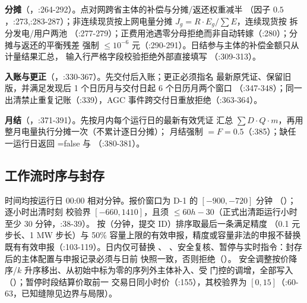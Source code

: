 \textbf{分摊}（，:264-292）。点对网跨省主体的补偿与分摊/返还权重减半
（因子 $0.5$，:273,:283-287）；非连续现货按上网电量分摊
$J_g=R\cdot E_g/\sum E$，连续现货按  拆分发电/用户两池
（:277-279）；正费用池遇零分母拒绝而非自动转嫁（:280）；分摊与返还的平衡残差
强制 $\le10^{-6}$ 元（:290-291）。日结参与主体的补偿金额只从计量结果汇总，
输入行严格字段校验拒绝外部直接填写 （:309-313）。

\textbf{入账与更正}（，:330-367）。先交付后入账；更正必须指名
最新原凭证、保留旧版，并满足发现后 1 个日历月与交付日起 6 个日历月两个窗口
（:347-348）；同一出清禁止重复记账（:339），AGC 事件跨交付日重放拒绝（:363-364）。

\textbf{月结}（，:371-391）。先按月内每个运行日的最新有效凭证
汇总 $\sum D\cdot Q\cdot m$，再用整月电量执行分摊一次（不累计逐日分摊）；
月结强制 $=F=0.5$（:385）；缺任一运行日返回
=false 与 （:380-381）。

\subsection{工作流时序与封存}
时间均按运行日 00:00 相对分钟。报价窗口为 D-1 的 $[-900,-720]$ 分钟
（）；逐小时出清时刻
 校验界 $[-660,1410]$，且须 $\le 60h-30$（正式出清距运行小时
至少 30 分钟，:38-39）。 按（分钟，提交 ID）排序取最后一条满足精度
（0.1 元步长、1 MW 步长）与 50\% 容量上限的有效申报，精度或容量非法的申报不替换
既有有效申报（:103-119）。日内仅可替换 、
、安全复核、暂停与实时指令：封存后的主体配置与申报记录必须与日前
快照一致，否则拒绝（）。
安全调整按价降序/$k$ 升序移出、从初始中标为零的序列外主体补入、受
 门控的调增，全部写入 
（）；暂停时段结算价取前一
交易日同小时价（:155），其校验界为 $[0,15]$（:60-63，已知缝隙见边界与局限）。

